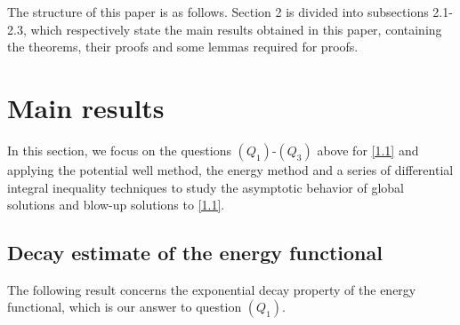 \documentclass[11pt,a4paper]{article}
\numberwithin{equation}{section}
\numberwithin{remark}{section}
\begin{document}
The structure of this paper is as follows. Section 2 is divided into subsections 2.1-2.3, which respectively state the main results obtained in this paper, containing the theorems, their proofs and some lemmas required for proofs.




\section{Main results}
\quad\quad
In this section, we focus on the questions $(Q_1)$-$(Q_3)$ above for \eqref{1.1} and applying the potential well method, the energy method and a series of differential integral inequality techniques to study the asymptotic behavior of global solutions and blow-up solutions to \eqref{1.1}.

\subsection{Decay estimate of the energy functional}
\quad\quad The following result concerns the exponential decay property of the energy functional, which is our answer to question $(Q_1)$.
\end{document}
